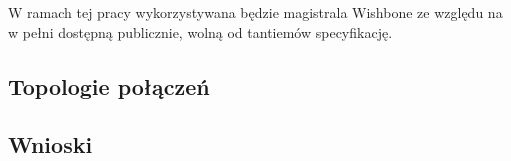 
W ramach tej pracy wykorzystywana będzie magistrala Wishbone ze względu na w pełni dostępną publicznie, wolną od tantiemów specyfikację.

\subsection{Topologie połączeń}


\subsection{Wnioski}

